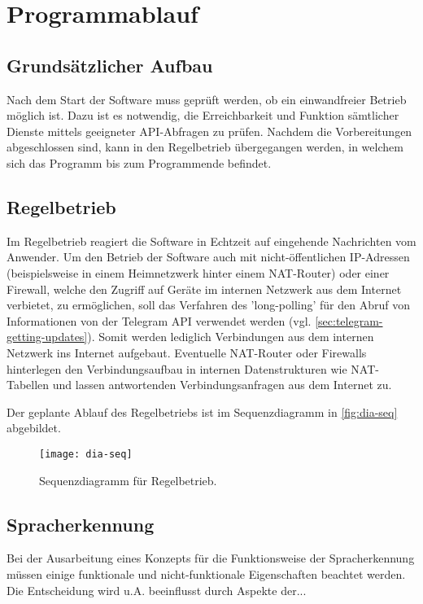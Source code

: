 \section{Programmablauf}

\subsection{Grundsätzlicher Aufbau}
\label{sec:grundsaetzlicher-aufbau}

Nach dem Start der Software muss geprüft werden, ob ein einwandfreier Betrieb möglich ist. Dazu ist es notwendig, die Erreichbarkeit und Funktion sämtlicher Dienste mittels geeigneter API-Abfragen zu prüfen. Nachdem die Vorbereitungen abgeschlossen sind, kann in den Regelbetrieb übergegangen werden, in welchem sich das Programm bis zum Programmende befindet. 

\subsection{Regelbetrieb}

Im Regelbetrieb reagiert die Software in Echtzeit auf eingehende Nachrichten vom Anwender. 
Um den Betrieb der Software auch mit nicht-öffentlichen IP-Adressen (beispielsweise in einem Heimnetzwerk hinter einem NAT-Router) oder einer Firewall, welche den Zugriff auf Geräte im internen Netzwerk aus dem Internet verbietet, zu ermöglichen, soll das Verfahren des 'long-polling' für den Abruf von Informationen von der Telegram API verwendet werden (vgl. \autoref{sec:telegram-getting-updates}). Somit werden lediglich Verbindungen aus dem internen Netzwerk ins Internet aufgebaut. Eventuelle NAT-Router oder Firewalls hinterlegen den Verbindungsaufbau in internen Datenstrukturen wie NAT-Tabellen und lassen antwortenden Verbindungsanfragen aus dem Internet zu.

Der geplante Ablauf des Regelbetriebs ist im Sequenzdiagramm in \autoref{fig:dia-seq} abgebildet.

\begin{figure}[h!]
\centering
\texttt{[image: dia-seq]}
\caption{Sequenzdiagramm für Regelbetrieb.}
\label{fig:dia-seq}
\end{figure}

\subsection{Spracherkennung}

Bei der Ausarbeitung eines Konzepts für die Funktionsweise der Spracherkennung müssen einige funktionale und nicht-funktionale Eigenschaften beachtet werden. Die Entscheidung wird u.A. beeinflusst durch Aspekte der... 

